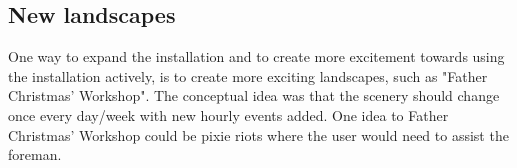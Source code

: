 \subsection{New landscapes}
One way to expand the installation and to create more excitement towards using the installation actively, is to create more exciting landscapes, such as "Father Christmas' Workshop". The conceptual idea was that the scenery should change once every day/week with new hourly events added. One idea to Father Christmas' Workshop could be pixie riots where the user would need to assist the foreman.
